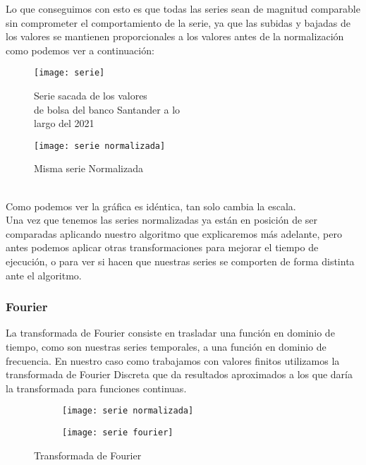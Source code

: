 \documentclass[12pt,a4paper]{article}
\begin{document}
		Lo que conseguimos con esto es que todas las series sean de magnitud comparable sin comprometer el comportamiento de la serie, ya que las subidas y bajadas de los valores se mantienen proporcionales a los valores antes de la normalización como podemos ver a continuación:\\
\begin{figure}[H]
\centering
\begin{minipage}{.5\textwidth}
  \centering
  \texttt{[image: serie]}
  \caption{Serie sacada de los valores\\ de bolsa del banco Santander a lo\\ largo del 2021}
  \label{fig:test1}
\end{minipage}%
\begin{minipage}{.5\textwidth}
  \centering
  \texttt{[image: serie normalizada]}
  \caption{Misma serie Normalizada\\ \phantom{filler}\\ \phantom{filler}}
  \label{fig:test2}
\end{minipage}
\end{figure}
		Como podemos ver la gráfica es idéntica, tan solo cambia la escala.\\
		Una vez que tenemos las series normalizadas ya están en posición de ser comparadas aplicando nuestro algoritmo que explicaremos más adelante, pero antes podemos aplicar otras transformaciones para mejorar el tiempo de ejecución, o para ver si hacen que nuestras series se comporten de forma distinta ante el algoritmo.
			\subsubsection{Fourier}
			La transformada de Fourier consiste en trasladar una función en dominio de tiempo, como son nuestras series temporales, a una función en dominio de frecuencia. En nuestro caso como trabajamos con valores finitos utilizamos la transformada de Fourier Discreta que da resultados aproximados a los que daría la transformada para funciones continuas. \\
			
\begin{figure}[H]
\centering
\begin{subfigure}{.5\textwidth}
  \centering
  \texttt{[image: serie normalizada]}
  \label{fig:sub1}
\end{subfigure}%
\begin{subfigure}{.5\textwidth}
  \centering
  \texttt{[image: serie fourier]}
  \label{fig:sub2}
\end{subfigure}
\caption{Transformada de Fourier}
\label{fig:test}
\end{figure}
\end{document}
